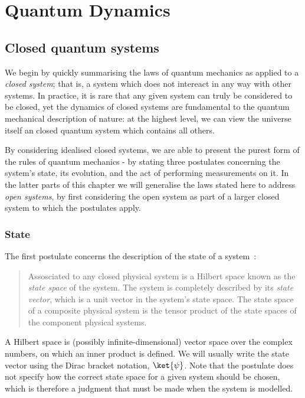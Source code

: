 \chapter{Quantum Dynamics} 
\label{ch:QuantumDynamics}

\section{Closed quantum systems}

We begin by quickly summarising the laws of quantum mechanics as applied to a \textit{closed system}; that is, a system which does not intereact in any way with other systems. In practice, it is rare that any given system can truly be considered to be closed, yet the dynamics of closed systems are fundamental to the quantum mechanical description of nature: at the highest level, we can view the universe itself an closed quantum system which contains all others.

By considering idealised closed systems, we are able to present the purest form of the rules of quantum mechanics - by stating three postulates concerning the system's state, its evolution, and the act of performing measurements on it. In the latter parts of this chapter we will generalise the laws stated here to address \textit{open systems}, by first considering the open system as part of a larger closed system to which the postulates apply.

\subsection{State}

The first postulate concerns the description of the state of a system~\cite{nielsen+chuang}:
\begin{quotation}
  Assosciated to any closed physical system is a Hilbert space known as the \textit{state space} of the system. The system is completely described by its \textit{state vector}, which is a unit vector in the system's state space. The state space of a composite physical system is the tensor product of the state spaces of the component physical systems.
\end{quotation}
A Hilbert space is (possibly infinite-dimensional) vector space over the complex numbers, on which an inner product is defined. We will usually write the state vector using the Dirac bracket notation, $\ket{\psi}$. Note that the postulate does not specify how the correct state space for a given system should be chosen, which is therefore a judgment that must be made when the system is modelled.

